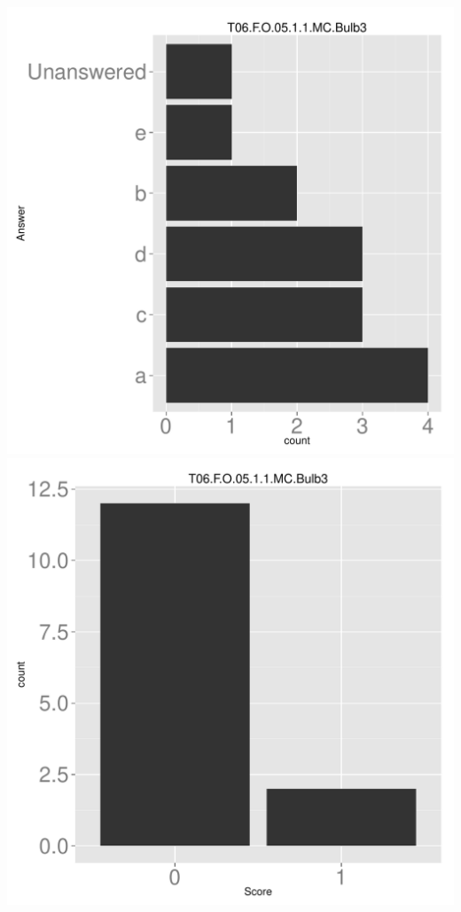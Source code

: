 \documentclass[12pt,nohyper]{tufte-handout}\usepackage[]{graphicx}\usepackage[]{color}
\begin{document}
\begin{center} \includegraphics[width=.45\linewidth]{Topic06_56_answer} \includegraphics[width=.45\linewidth]{Topic06_56_score} \end{center} 
\end{document}
